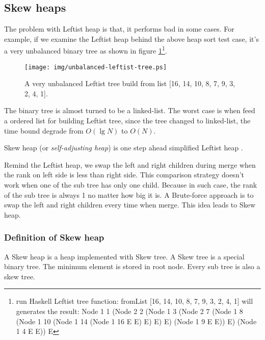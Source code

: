 \documentclass{article}
\begin{document}


\subsection{Skew heaps}
\label{skew-heap}

The problem with Leftist heap is that, it performs bad in some cases.
For example, if we examine the Leftist heap behind the above heap
sort test case, it's a very unbalanced binary tree as shown in figure
\ref{fig:unbalanced-leftist-tree}\footnote{run Haskell Leftist tree
function: fromList [16, 14, 10, 8, 7, 9, 3, 2, 4, 1] will generates
the result: Node 1 1 (Node 2 2 (Node 1 3 (Node 2 7 (Node 1 8 (Node 1 10 (Node 1 14 (Node 1 16 E E) E) E) E) (Node 1 9 E E)) E) (Node 1 4 E E)) E}.

\begin{figure}[htbp]
   \begin{center}
   	  \texttt{[image: img/unbalanced-leftist-tree.ps]}
    \caption{A very unbalanced Leftist tree build from list [16, 14, 10, 8, 7, 9, 3, 2, 4, 1].} \label{fig:unbalanced-leftist-tree}
   \end{center}
\end{figure}

The binary tree is almost turned to be a linked-list. The worst case
is when feed a ordered list for building Leftist tree, since the 
tree changed to linked-list, the time bound degrade from $O(\lg N)$
to $O(N)$.

Skew heap (or {\em self-adjusting heap}) is one step ahead simplified Leftist heap \cite{wiki-skew-heap} \cite{self-adjusting-heaps}.

Remind the Leftist heap, we swap the left and right children during merge
when the rank on left side is less than right side. This comparison strategy 
doesn't work when one of the sub tree has only one child. Because
in such case, the rank of the sub tree is always 1 no matter how
big it is. A Brute-force approach is to swap the left and right children
every time when merge. This idea leads to Skew heap.

\subsubsection{Definition of Skew heap}

A Skew heap is a heap implemented with Skew tree. A Skew tree is a special 
binary tree. The minimum element is stored in root node. Every sub tree is 
also a skew tree.
\end{document}
